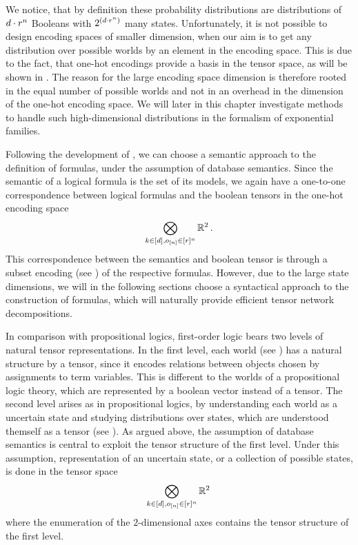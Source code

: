 We notice, that by definition these probability distributions are distributions of $d\cdot r^{n}$ Booleans with $2^{\left(d\cdot r^{n}\right)}$ many states.
Unfortunately, it is not possible to design encoding spaces of smaller dimension, when our aim is to get any distribution over possible worlds by an element in the encoding space.
This is due to the fact, that one-hot encodings provide a basis in the tensor space, as will be shown in .
The reason for the large encoding space dimension is therefore rooted in the equal number of possible worlds and not in an overhead in the dimension of the one-hot encoding space.
We will later in this chapter investigate methods to handle such high-dimensional distributions in the formalism of exponential families.


Following the development of , we can choose a semantic approach to the definition of formulas, under the assumption of database semantics.
Since the semantic of a logical formula is the set of its models, we again have a one-to-one correspondence between logical formulas and the boolean tensors in the one-hot encoding space
\begin{align*}
    \bigotimes_{k\in[d],o_{[n]}\in[r]^{n}} \mathbb{R}^2 \, .
\end{align*}
This correspondence between the semantics and boolean tensor is through a subset encoding (see ) of the respective formulas.
However, due to the large state dimensions, we will in the following sections choose a syntactical approach to the construction of formulas, which will naturally provide efficient tensor network decompositions.


In comparison with propositional logics, first-order logic bears two levels of natural tensor representations.
In the first level, each world (see ) has a natural structure by a tensor, since it encodes relations between objects chosen by assignments to term variables.
This is different to the worlds of a propositional logic theory, which are represented by a boolean vector instead of a tensor.
The second level arises as in propositional logics, by understanding each world as a uncertain state and studying distributions over states, which are understood themself as a tensor (see ).
As argued above, the assumption of database semantics is central to exploit the tensor structure of the first level.
Under this assumption, representation of an uncertain state, or a collection of possible states, is done in the tensor space
\begin{align*}
    \bigotimes_{k\in[d],o_{[n]}\in[r]^{n}} \mathbb{R}^2 \,
\end{align*}
where the enumeration of the $2$-dimensional axes contains the tensor structure of the first level.



